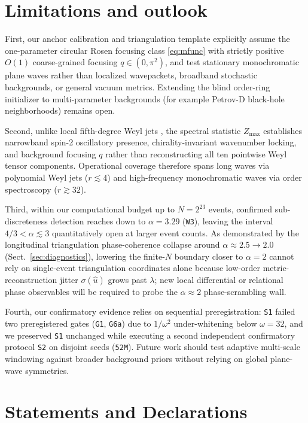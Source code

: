 \documentclass[11pt,a4paper]{article}
\begin{document}
\section{Limitations and outlook}\label{sec:limits}
First, our anchor calibration and triangulation template explicitly assume the one-parameter
circular Rosen focusing class \eqref{eq:mfunc} with strictly positive $O(1)$ coarse-grained
focusing $q \in (0, \pi^2)$, and test stationary monochromatic plane waves rather than localized
wavepackets, broadband stochastic backgrounds, or general vacuum metrics. Extending the
blind order-ring initializer to multi-parameter backgrounds (for example Petrov-D black-hole
neighborhoods) remains open.

Second, unlike local fifth-degree Weyl jets \cite{weylnote}, the spectral statistic $Z_{\max}$
establishes narrowband spin-2 oscillatory presence, chirality-invariant wavenumber locking,
and background focusing $q$ rather than reconstructing all ten pointwise Weyl tensor components.
Operational coverage therefore spans long waves via polynomial Weyl jets ($r \lesssim 4$)
and high-frequency monochromatic waves via order spectroscopy ($r \gtrsim 32$).

Third, within our computational budget up to $N = 2^{23}$ events, confirmed sub-discreteness
detection reaches down to $\alpha = 3.29$ (\texttt{W3}), leaving the interval $4/3 < \alpha \lesssim 3$
quantitatively open at larger event counts. As demonstrated by the longitudinal triangulation phase-coherence
collapse around $\alpha \approx 2.5 \to 2.0$ (Sect.~\ref{sec:diagnostics}), lowering the
finite-$N$ boundary closer to $\alpha = 2$ cannot rely on single-event triangulation coordinates
alone because low-order metric-reconstruction jitter $\sigma(\hat{u})$ grows past $\lambda$;
new local differential or relational phase observables will be required to probe the
$\alpha \approx 2$ phase-scrambling wall.

Fourth, our confirmatory evidence relies on sequential preregistration: \texttt{S1} failed two
preregistered gates (\texttt{G1}, \texttt{G6a}) due to $1/\omega^2$ under-whitening below $\omega = 32$, and
we preserved \texttt{S1} unchanged while executing a second independent confirmatory protocol
\texttt{S2} on disjoint seeds (\texttt{52M}). Future work should test adaptive multi-scale windowing
against broader background priors without relying on global plane-wave symmetries.

\section*{Statements and Declarations}
\end{document}
